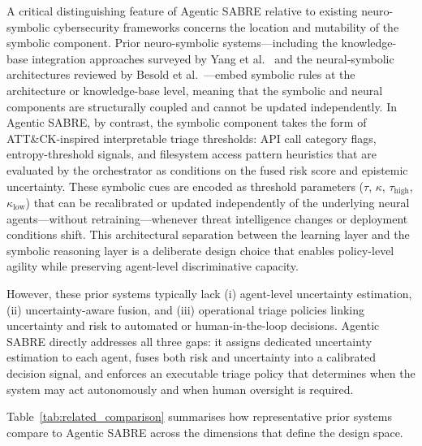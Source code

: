 \documentclass[3p]{elsarticle}
\begin{document}
A critical distinguishing feature of Agentic SABRE relative to existing neuro-symbolic cybersecurity frameworks concerns the location and mutability of the symbolic component. Prior neuro-symbolic systems---including the knowledge-base integration approaches surveyed by Yang et al.~\cite{YangSBK25} and the neural-symbolic architectures reviewed by Besold et al.~\cite{Besold2021neurosymbolicsurvey}---embed symbolic rules at the architecture or knowledge-base level, meaning that the symbolic and neural components are structurally coupled and cannot be updated independently. In Agentic SABRE, by contrast, the symbolic component takes the form of ATT\&CK-inspired interpretable triage thresholds: API call category flags, entropy-threshold signals, and filesystem access pattern heuristics that are evaluated by the orchestrator as conditions on the fused risk score and epistemic uncertainty. These symbolic cues are encoded as threshold parameters ($\tau$, $\kappa$, $\tau_{\text{high}}$, $\kappa_{\text{low}}$) that can be recalibrated or updated independently of the underlying neural agents---without retraining---whenever threat intelligence changes or deployment conditions shift. This architectural separation between the learning layer and the symbolic reasoning layer is a deliberate design choice that enables policy-level agility while preserving agent-level discriminative capacity.

However, these prior systems typically lack (i) agent-level uncertainty
estimation, (ii) uncertainty-aware fusion, and (iii) operational triage policies linking uncertainty and risk to automated or human-in-the-loop decisions. Agentic SABRE directly addresses all three gaps: it assigns dedicated uncertainty estimation to each agent, fuses both risk and uncertainty into a calibrated decision signal, and enforces an executable triage policy that determines when the system may act autonomously and when human oversight is required.

Table~\ref{tab:related_comparison} summarises how representative prior systems compare to
Agentic SABRE across the dimensions that define the design space.
\end{document}
